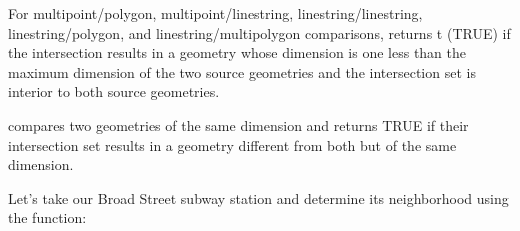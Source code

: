 \documentclass[a4paper,11pt,english]{sphinxmanual}
\begin{document}
For multipoint/polygon, multipoint/linestring, linestring/linestring, linestring/polygon, and linestring/multipolygon comparisons,  returns t (TRUE) if the intersection results in a geometry whose dimension is one less than the maximum dimension of the two source geometries and the intersection set is interior to both source geometries.

\begin{figure}[htbp]
\centering

\noindent{}
\end{figure}

 compares two geometries of the same dimension and returns TRUE if their intersection set results in a geometry different from both but of the same dimension.

Let’s take our Broad Street subway station and determine its neighborhood using the  function:

\begin{sphinxVerbatim}[commandchars=\\\{\}]
  
 
   
\end{sphinxVerbatim}

\begin{sphinxVerbatim}[commandchars=\\\{\}]
 
\end{sphinxVerbatim}

\begin{sphinxVerbatim}[commandchars=\\\{\}]
  
 
  
\end{sphinxVerbatim}
\end{document}
